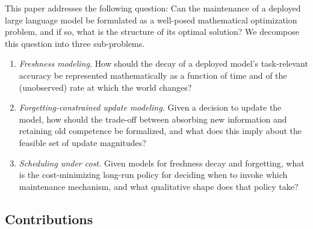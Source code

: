 \documentclass[electronics,article,submit,pdftex,moreauthors]{Definitions/mdpi}
\begin{document}
This paper addresses the following question: Can the maintenance of a deployed large language model be formulated as a well-posed mathematical optimization problem, and if so, what is the structure of its optimal solution? We decompose this question into three sub-problems.
\begin{enumerate}
\item \textit{Freshness modeling.} How should the decay of a deployed model's task-relevant accuracy be represented mathematically as a function of time and of the (unobserved) rate at which the world changes?
\item \textit{Forgetting-constrained update modeling.} Given a decision to update the model, how should the trade-off between absorbing new information and retaining old competence be formalized, and what does this imply about the feasible set of update magnitudes?
\item \textit{Scheduling under cost.} Given models for freshness decay and forgetting, what is the cost-minimizing long-run policy for deciding when to invoke which maintenance mechanism, and what qualitative shape does that policy take?
\end{enumerate}

\subsection{Contributions}
\end{document}
